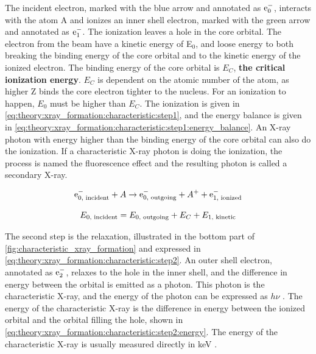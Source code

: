 The incident electron, marked with the blue arrow and annotated as $\textnormal{e}^-_{0}$, interacts with the atom A and ionizes an inner shell electron, marked with the green arrow and annotated as $\textnormal{e}^-_{1}$.
The ionization leaves a hole in the core orbital.
The electron from the beam have a kinetic energy of E$_{0}$, and loose energy to both breaking the binding energy of the core orbital and to the kinetic energy of the ionized electron.
The binding energy of the core orbital is $E_C$, \textbf{the critical ionization energy}.
$E_C$ is dependent on the atomic number of the atom, as higher Z binds the core electron tighter to the nucleus.
For an ionization to happen, $E_0$ must be higher than $E_C$.
The ionization is given in \cref{eq:theory:xray_formation:characteristic:step1}, and the energy balance is given in \cref{eq:theory:xray_formation:characteristic:step1:energy_balance}.
An X-ray photon with energy higher than the binding energy of the core orbital can also do the ionization.
If a characteristic X-ray photon is doing the ionization, the process is named the fluorescence effect and the resulting photon is called a secondary X-ray.

\begin{equation}
    \label{eq:theory:xray_formation:characteristic:step1}
    \textnormal{e}^-_{0 \textnormal{, incident}} + A \rightarrow \textnormal{e}^-_{0 \textnormal{, outgoing}} + A^+ + \textnormal{e}^-_{1 \textnormal{, ionized}}
\end{equation}

\begin{equation}
    \label{eq:theory:xray_formation:characteristic:step1:energy_balance}
    E_{0 {\textnormal{, incident}}} = E_{0 {\textnormal{, outgoing}}} + E_{C} + E_{1 {\textnormal{, kinetic}}}
\end{equation}




The second step is the relaxation, illustrated in the bottom part of \cref{fig:characteristic_xray_formation} and expressed in \cref{eq:theory:xray_formation:characteristic:step2}.
An outer shell electron, annotated as $\textnormal{e}^-_{2}$, relaxes to the hole in the inner shell, and the difference in energy between the orbital is emitted as a photon.
This photon is the characteristic X-ray, and the energy of the photon can be expressed as $h\nu$ \cite[Eq. (8.12)]{hollas_modern_2004}.
The energy of the characteristic X-ray is the difference in energy between the ionized orbital and the orbital filling the hole, shown in \cref{eq:theory:xray_formation:characteristic:step2:energy}.
The energy of the characteristic X-ray is usually measured directly in keV \cite[Eq. (4.2b)]{goldstein_scanning_2018}.



